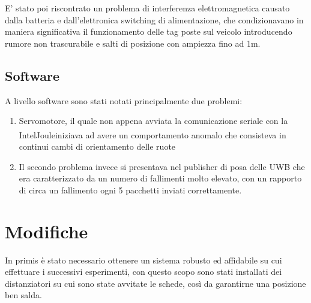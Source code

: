 E’ stato poi riscontrato un problema di interferenza elettromagnetica causato dalla batteria e dall'elettronica switching di alimentazione, che condizionavano in maniera significativa il funzionamento delle tag poste sul veicolo introducendo rumore non trascurabile e salti di posizione con ampiezza fino ad 1m.
\subsection{Software}
\label{subsection1.2.2}

A livello software sono stati notati principalmente due problemi:
\begin{enumerate}
    \item Servomotore, il quale non appena avviata la comunicazione seriale con la Intel\textsuperscript\textregistered  \hspace{1mm}Joule\texttrademark \hspace{1mm}iniziava ad avere un comportamento anomalo che consisteva in continui cambi di orientamento delle ruote
    \item Il secondo problema invece si presentava nel publisher di posa delle UWB che era caratterizzato da un numero di fallimenti molto elevato, con un rapporto di circa un fallimento ogni 5 pacchetti inviati correttamente.
\end{enumerate}
\section{Modifiche}
\label{section1.3}

In primis è stato necessario ottenere un sistema robusto ed affidabile su cui effettuare i successivi esperimenti, con questo scopo sono stati installati dei distanziatori su cui sono state avvitate le schede, così da garantirne una posizione ben salda.

\medskip

